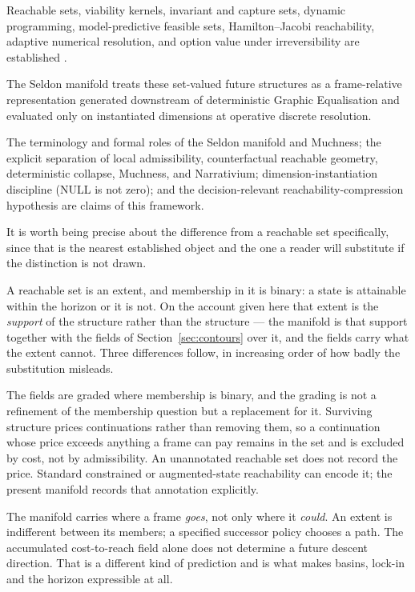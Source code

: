 \documentclass[11pt,a4paper]{article}
\theoremstyle{remark}
\begin{document}
\begin{description}[leftmargin=*,style=nextline]
\item[Established prior art.] Reachable sets, viability kernels, invariant and capture sets, dynamic programming, model-predictive feasible sets, Hamilton--Jacobi reachability, adaptive numerical resolution, and option value under irreversibility are established \citep{bellman1957,aubin1991,mitchell2005,berger1984,arrow1974,rawlings2017}.
\item[Structural synthesis.] The Seldon manifold treats these set-valued future structures as a frame-relative representation generated downstream of deterministic Graphic Equalisation and evaluated only on instantiated dimensions at operative discrete resolution.
\item[Specific contributions.] The terminology and formal roles of the Seldon manifold and Muchness; the explicit separation of local admissibility, counterfactual reachable geometry, deterministic collapse, Muchness, and Narrativium; dimension-instantiation discipline (NULL is not zero); and the decision-relevant reachability-compression hypothesis are claims of this framework.
\end{description}

It is worth being precise about the difference from a reachable set specifically, since that is the
nearest established object and the one a reader will substitute if the distinction is not drawn.

A reachable set is an extent, and membership in it is binary: a state is attainable within the
horizon or it is not. On the account given here that extent is the \emph{support} of the structure
rather than the structure --- the manifold is that support together with the fields of
Section~\ref{sec:contours} over it, and the fields carry what the extent cannot. Three differences
follow, in increasing order of how badly the substitution misleads.

The fields are graded where membership is binary, and the grading is not a refinement of the
membership question but a replacement for it. Surviving structure prices continuations rather than
removing them, so a continuation whose price exceeds anything a frame can pay remains in the set and
is excluded by cost, not by admissibility. An unannotated reachable set does not record the price. Standard constrained or augmented-state reachability can encode it; the present manifold records that annotation explicitly.

The manifold carries where a frame \emph{goes}, not only where it \emph{could}. An extent is
indifferent between its members; a specified successor policy chooses a path. The accumulated cost-to-reach field alone does not determine a future descent direction. That is a different kind of prediction
and is what makes basins, lock-in and the horizon expressible at all.
\end{document}
